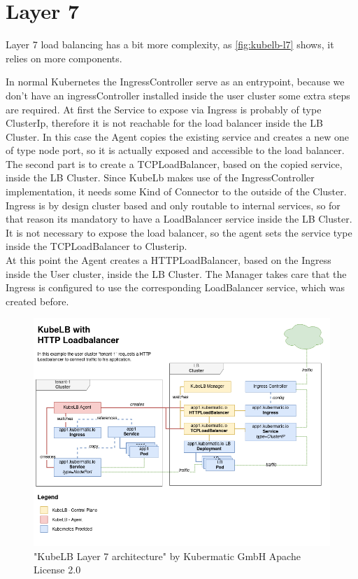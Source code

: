 \section{Layer 7}

Layer 7 load balancing has a bit more complexity, as \autoref{fig:kubelb-l7} shows, it relies on more components.

In normal Kubernetes the IngressController serve as an entrypoint, because we don't have an ingressController installed inside the user cluster some extra steps are required.
At first the Service to expose via Ingress is probably of type ClusterIp, therefore it is not reachable for the load balancer inside the LB Cluster.
In this case the Agent copies the existing service and creates a new one of type node port, so it is actually exposed and accessible to the load balancer.
\\
The second part is to create a TCPLoadBalancer, based on the copied service, inside the LB Cluster.
Since KubeLb makes use of the IngressController implementation, it needs some Kind of Connector to the outside of the Cluster.
Ingress is by design cluster based and only routable to internal services, so for that reason its mandatory to have a LoadBalancer service inside the LB Cluster.
It is not necessary to expose the load balancer, so the agent sets the service type inside the TCPLoadBalancer to Clusterip.
\\
At this point the Agent creates a HTTPLoadBalancer, based on the Ingress inside the User cluster, inside the LB Cluster.
The Manager takes care that the Ingress is configured to use the corresponding LoadBalancer service, which was created before.


\begin{figure}[H]
    \centering
    \includegraphics[width=1\linewidth]{media/06/kubelb-l7}
    \caption{"KubeLB Layer 7 architecture"  by Kubermatic GmbH Apache License 2.0}
    \label{fig:kubelb-l7}
\end{figure}

